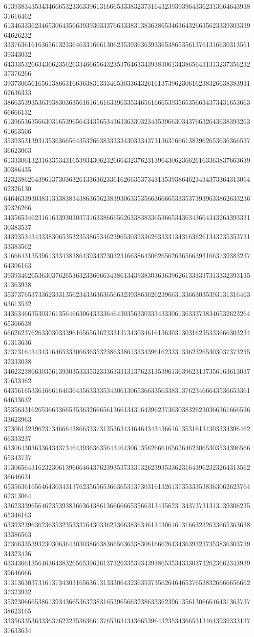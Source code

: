 61393834353434666532336339613166653338323731643239393964336231366464393831616462
61346333623465306435663939303337663338313836386534636432663562333930333964626232
33376361616365613233646331666130623539363639336538653561376131663031356139343032
64333532663436623562633466656432353764633439383061343865643131323735623237376266
39373065616561386631663638313334653033643261613739623061623832663838393162636333
38663539353639383036356161616163396335346561666539356535663437343165366366666132
61396536356630316539656434356534363363303234353966303437663264363839326361663566
35393531393135363665643532663833333430333437313637666138396265363636653736623063
61333061323163353431653934306232666432376231396430623662616336383766363930386435
32323862643961373036326133636233616266353734313539386462343437336431306462326130
64646339303831333838343863656238393063353566366665333537393963386263323639326266
34356534623161633930303731633866656263383833653665343634366434326439333130383537
34393534343338306535323538653462396530393362633331343163626134323535373133383562
31666431353961333438386439343230323166386430626562636566393166373938323764306163
39393462653630376265363233666634386134393830363639626133333731333239313531363938
35373765373362333135623433636365663239386362623966313366303539313131646363613532
34363466353037613564663064333364643035633033343330613633373834653262326465366638
66626237626330303339616565636233313734303461613630313031623533366630323461313636
37373164343431646533306636353238633861333439616233313362326530303737323532333038
34623238663035613930353335323336333131376231353961363962313735616361303737633462
64356165336166616463643563333534306130653663356338313762346664353665336164633632
35356331626536633665353632666561366134316439623736303832623036636166653633623963
32306132396237346664386633373135363434646434343661613531613430333439646266333237
63306430363364343734643936363564346430613562666165626462306530353439656665343737
31306564316232306139666464376239353733313262393533623164396232326431356236646631
65356361656464303431376235656536636531373031613261373533353836306262376462313064
33623339656462353938366364386136666665356631343562313437373131313930623565346163
63393239636236353235333764303362336638363461343061613166323263366536363833386563
37366335393230306364303038663836656363383061666264343639323735383630373934323436
63343661356463643832656539626137326335393439386535343330373262366234393939646666
31313630373161373430316563613133306432363537356264646537653832666665666237323932
35323066653861393436653632383165396566323863336239613561306664643136373738623165
33356335363336376232353636613765363434366539643235343665313464393933313737633634
